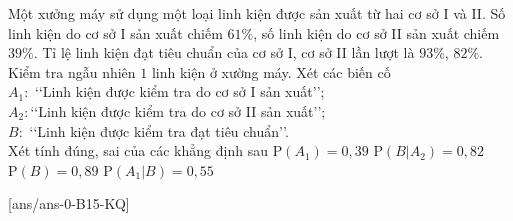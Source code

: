 \begin{ex}%
	Một xưởng máy sử dụng một loại linh kiện được sản xuất từ hai cơ sở I và II. Số linh kiện do cơ sở I sản xuất chiếm $61 \%$, số linh kiện do cơ sở II sản xuất chiếm $39 \%$. Tỉ lệ linh kiện đạt tiêu chuẩn của cơ sở I, cơ sở II lần lượt là $93 \%$, $82 \%$. Kiểm tra ngẫu nhiên $1$ linh kiện ở xường máy. Xét các biến cố\\
	$A_1\colon$ \lq\lq  Linh kiện được kiểm tra do cơ sở I sản xuất\rq\rq;\\
	$A_2\colon$\lq\lq  Linh kiện được kiểm tra do cơ sở II sản xuất\rq\rq;\\
	$B\colon$ \lq\lq  Linh kiện được kiểm tra đạt tiêu chuẩn\rq\rq.\\
	Xét tính đúng, sai của các khẳng định sau
	\choiceTF
	{$\mathrm{P}\left(A_1\right)=0{,}39$} 
	{\True $\mathrm{P}\left(B | A_2\right)=0{,}82$}
	{$\mathrm{P}(B)=0{,}89$}
	{\True $\mathrm{P}\left(A_1 | B\right)=0{,}55$}
\end{ex}
[ans/ans-0-B15-KQ]

